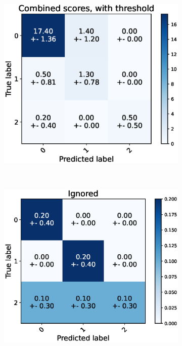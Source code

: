 \begin{figure}[h]
  \begin{subfigure}[t]{0.48\textwidth}
      \includegraphics[width=\textwidth]{files/figs/res/kmfp/cnf-combined-th.eps}
      \caption{}
      \label{fig:kmfp-cnf-comb-th}
  \end{subfigure}
  ~
  \begin{subfigure}[t]{0.48\textwidth}
      \includegraphics[width=\textwidth]{files/figs/res/kmfp/cnf-ignored.eps}

\end{subfigure}
\end{figure}
